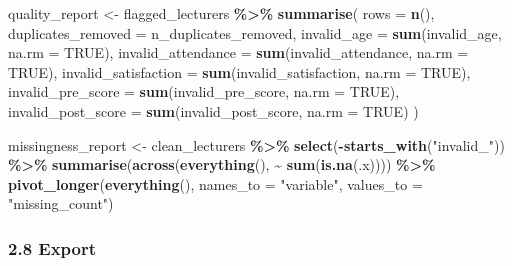 \documentclass[11pt]{article}
\newenvironment{Shaded}{\begin{snugshade}}{\end{snugshade}}
\newcommand{\AttributeTok}[1]{\textcolor[rgb]{0.13,0.29,0.53}{#1}}
\newcommand{\ConstantTok}[1]{\textcolor[rgb]{0.56,0.35,0.01}{#1}}
\newcommand{\FunctionTok}[1]{\textcolor[rgb]{0.13,0.29,0.53}{\textbf{#1}}}
\newcommand{\NormalTok}[1]{#1}
\newcommand{\OtherTok}[1]{\textcolor[rgb]{0.56,0.35,0.01}{#1}}
\newcommand{\SpecialCharTok}[1]{\textcolor[rgb]{0.81,0.36,0.00}{\textbf{#1}}}
\newcommand{\StringTok}[1]{\textcolor[rgb]{0.31,0.60,0.02}{#1}}
\begin{document}
\begin{Shaded}
\begin{Highlighting}[]
\NormalTok{quality\_report }\OtherTok{\textless{}{-}}\NormalTok{ flagged\_lecturers }\SpecialCharTok{\%\textgreater{}\%}
  \FunctionTok{summarise}\NormalTok{(}
    \AttributeTok{rows =} \FunctionTok{n}\NormalTok{(),}
    \AttributeTok{duplicates\_removed =}\NormalTok{ n\_duplicates\_removed,}
    \AttributeTok{invalid\_age =} \FunctionTok{sum}\NormalTok{(invalid\_age, }\AttributeTok{na.rm =} \ConstantTok{TRUE}\NormalTok{),}
    \AttributeTok{invalid\_attendance =} \FunctionTok{sum}\NormalTok{(invalid\_attendance, }\AttributeTok{na.rm =} \ConstantTok{TRUE}\NormalTok{),}
    \AttributeTok{invalid\_satisfaction =} \FunctionTok{sum}\NormalTok{(invalid\_satisfaction, }\AttributeTok{na.rm =} \ConstantTok{TRUE}\NormalTok{),}
    \AttributeTok{invalid\_pre\_score =} \FunctionTok{sum}\NormalTok{(invalid\_pre\_score, }\AttributeTok{na.rm =} \ConstantTok{TRUE}\NormalTok{),}
    \AttributeTok{invalid\_post\_score =} \FunctionTok{sum}\NormalTok{(invalid\_post\_score, }\AttributeTok{na.rm =} \ConstantTok{TRUE}\NormalTok{)}
\NormalTok{  )}

\NormalTok{missingness\_report }\OtherTok{\textless{}{-}}\NormalTok{ clean\_lecturers }\SpecialCharTok{\%\textgreater{}\%}
  \FunctionTok{select}\NormalTok{(}\SpecialCharTok{{-}}\FunctionTok{starts\_with}\NormalTok{(}\StringTok{"invalid\_"}\NormalTok{)) }\SpecialCharTok{\%\textgreater{}\%}
  \FunctionTok{summarise}\NormalTok{(}\FunctionTok{across}\NormalTok{(}\FunctionTok{everything}\NormalTok{(), }\SpecialCharTok{\textasciitilde{}} \FunctionTok{sum}\NormalTok{(}\FunctionTok{is.na}\NormalTok{(.x)))) }\SpecialCharTok{\%\textgreater{}\%}
  \FunctionTok{pivot\_longer}\NormalTok{(}\FunctionTok{everything}\NormalTok{(), }\AttributeTok{names\_to =} \StringTok{"variable"}\NormalTok{, }\AttributeTok{values\_to =} \StringTok{"missing\_count"}\NormalTok{)}
\end{Highlighting}
\end{Shaded}

\hypertarget{export}{%
\subsubsection{2.8 Export}\label{export}}
\end{document}
